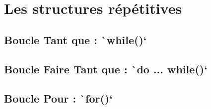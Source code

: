 \documentclass[10pt]{article}
\begin{document}
\section{Les structures répétitives}
\subsection{Boucle Tant que : \texttt`while()`}
\subsection{Boucle Faire Tant que : \texttt`do ... while()`}
\subsection{Boucle Pour : \texttt`for()`}
\end{document}
